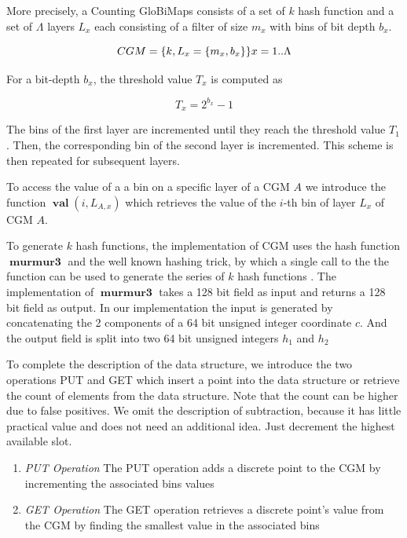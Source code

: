 \documentclass[sigconf, nonacm]{acmart}
\DeclareMathOperator{\val}{\textbf{val}}
\DeclareMathOperator{\hash}{\textbf{murmur3}}
\begin{document}
More precisely, a  Counting GloBiMaps consists of a set of $k$ hash function
and a set of $\Lambda$ layers $L_x$ each consisting of a filter of
size $m_x$ with bins of bit depth $b_x$.

$$CGM = \{k, L_x = \{m_x, b_x\} \} \space x=1..\Lambda  $$

For a bit-depth $b_x$, the threshold value $T_x$ is computed as

$$ T_x = 2^{b_x}-1$$

The bins of the first layer are incremented until they reach the threshold value
$T_1$. Then, the corresponding bin of the second layer is
incremented. This scheme is then repeated for subsequent layers.

To access the value of a a bin on a specific layer of a CGM $A$ we introduce the function $\val(i, L_{A,x})$ which retrieves the value of the $i$-th bin of layer $L_x$ of CGM $A$.

To generate $k$ hash functions, the implementation of CGM uses the hash function $\hash$ and the well known hashing trick, by which a single call to the the function can be used to generate the series of $k$ hash functions \cite{werner2021globimapsai}.
The implementation of $\hash$ takes a 128 bit field as input and returns a 128 bit field as output. In our implementation the input is generated by concatenating the 2 components of a 64 bit unsigned integer coordinate $c$. And the output field is split into two 64 bit unsigned integers $h_1$ and $h_2$

To complete the description of the data structure, we introduce the two operations PUT and GET which insert a point into the data structure or
retrieve the count of elements from the data structure. Note that the count can be higher due to false positives. We omit the description of subtraction, because it has little practical value and does not need an additional idea. Just decrement the highest available slot.


\begin{enumerate}
  \item{\emph{PUT Operation} The PUT operation adds a discrete point to the CGM by incrementing the associated bins values }
  \item{\emph{GET Operation} The GET operation retrieves a discrete point's value from the CGM  by finding the smallest value in the associated bins}
\end{enumerate}
\end{document}
